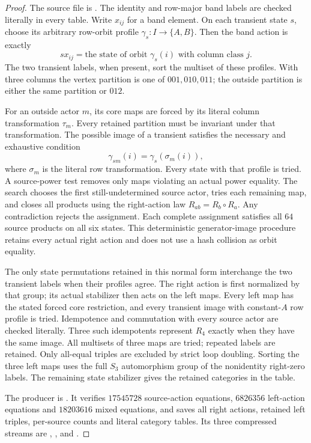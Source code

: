 \begin{proof}
The source file is
.
The identity and row-major band labels are checked literally
in every table.  Write $x_{ij}$ for a band element.  On each
transient state $s$, choose its arbitrary row-orbit profile
$\gamma_s:I\to\{A,B\}$.  Then the band action is exactly
\[
 s x_{ij}=\text{the state of orbit }\gamma_s(i)
                 \text{ with column class }j.
\]
The two transient labels, when present, sort the multiset
of these profiles.  With three columns the vertex partition
is one of $001,010,011$; the outside partition is either
the same partition or $012$.

For an outside actor $m$, its core maps are forced by its
literal column transformation $\tau_m$.  Every retained
partition must be invariant under that transformation.
The possible image of a transient satisfies the necessary
and exhaustive condition
\[
 \gamma_{sm}(i)=\gamma_s(\sigma_m(i)),
\]
where $\sigma_m$ is the literal row transformation.
Every state with that profile is tried.  A source-power
test removes only maps violating an actual power equality.
The search chooses the first still-undetermined source
actor, tries each remaining map, and closes all products
using the right-action law $R_{ab}=R_b\circ R_a$.
Any contradiction rejects the assignment.  Each complete
assignment satisfies all $64$ source products on all six
states.  This deterministic generator-image procedure
retains every actual right action and does not use a
hash collision as orbit equality.

The only state permutations retained in this normal form
interchange the two transient labels when their profiles
agree.  The right action is first normalized by that
group; its actual stabilizer then acts on the left maps.
Every left map has the stated forced core restriction,
and every transient image with constant-$A$ row profile
is tried.  Idempotence and commutation with every source
actor are checked literally.  Three such idempotents
represent $R_4$ exactly when they have the same image.
All multisets of three maps are tried; repeated labels
are retained.  Only all-equal triples are excluded by
strict loop doubling.  Sorting the three left maps uses
the full $S_3$ automorphism group of the nonidentity
right-zero labels.  The remaining state stabilizer gives
the retained categories in the table.

The producer is .
It verifies $17545728$ source-action equations,
$6826356$ left-action equations and $18203616$ mixed
equations, and saves all right actions, retained left
triples, per-source counts and literal category tables.
Its three compressed streams are
,
, and
.


\end{proof}
